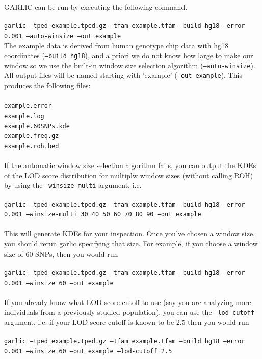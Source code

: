 \documentclass[12pt]{article}%
\begin{document}
GARLIC can be run by executing the following command.
~\\\\
{\tt garlic --tped example.tped.gz --tfam example.tfam --build hg18 --error 0.001 --auto-winsize --out example}
~\\
\noindent The example data is derived from human genotype chip data with hg18 coordinates ({\tt --build hg18}), and a priori we do not know how large to make our window so we use the built-in window size selection algorithm ({\tt --auto-winsize}).  All output files will be named starting with 'example' ({\tt --out example}).  This produces the following files:
~\\\\
{\tt example.error}
~\\
{\tt example.log}
~\\
{\tt example.60SNPs.kde}
~\\
{\tt example.freq.gz}
~\\
{\tt example.roh.bed}
~\\\\
\noindent If the automatic window size selection algorithm fails, you can output the KDEs of the LOD score distribution for multiplw window sizes (without calling ROH) by using the {\tt --winsize-multi} argument, i.e.
~\\\\
{\tt garlic --tped example.tped.gz --tfam example.tfam --build hg18 --error 0.001 --winsize-multi 30 40 50 60 70 80 90 --out example}
~\\\\
\noindent This will generate KDEs for your inspection.  Once you've chosen a window size, you should rerun garlic specifying that size.  For example, if you choose a window size of 60 SNPs, then you would run
~\\\\
{\tt garlic --tped example.tped.gz --tfam example.tfam --build hg18 --error 0.001 --winsize 60 --out example}
~\\\\
\noindent If you already know what LOD score cutoff to use (say you are analyzing more individuals from a previously studied population), you can use the {\tt --lod-cutoff} argument, i.e. if your LOD score cutoff is known to be 2.5 then you would run
~\\\\
{\tt garlic --tped example.tped.gz --tfam example.tfam --build hg18 --error 0.001 --winsize 60 --out example --lod-cutoff 2.5}
~\\\\
\end{document}
